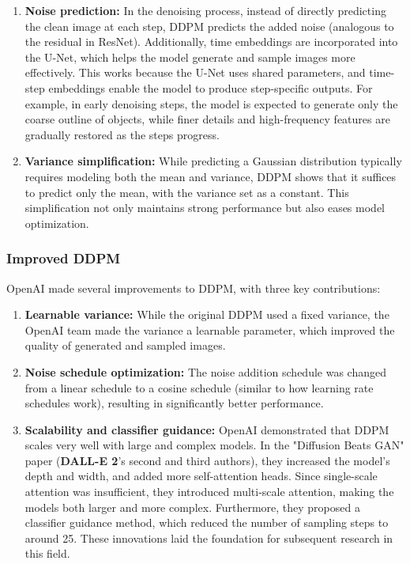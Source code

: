 \documentclass{article}
\begin{document}
\begin{enumerate}
    \item \textbf{Noise prediction:} In the denoising process, instead of directly predicting the clean image 
    at each step, DDPM predicts the added noise (analogous to the residual in ResNet). Additionally, time 
    embeddings are incorporated into the U-Net, which helps the model generate and sample images more 
    effectively. This works because the U-Net uses shared parameters, and time-step embeddings enable the 
    model to produce step-specific outputs. For example, in early denoising steps, the model is expected to 
    generate only the coarse outline of objects, while finer details and high-frequency features are 
    gradually restored as the steps progress.
    \item \textbf{Variance simplification:} While predicting a Gaussian distribution typically requires 
    modeling both the mean and variance, DDPM shows that it suffices to predict only the mean, with the 
    variance set as a constant. This simplification not only maintains strong performance but also eases 
    model optimization.
\end{enumerate}

\subsubsection{Improved DDPM}

OpenAI made several improvements to DDPM, with three key contributions:

\begin{enumerate}
    \item \textbf{Learnable variance:} While the original DDPM used a fixed variance, the OpenAI team made 
    the variance a learnable parameter, which improved the quality of generated and sampled images.
    \item \textbf{Noise schedule optimization:} The noise addition schedule was changed from a linear 
    schedule to a cosine schedule (similar to how learning rate schedules work), resulting in significantly 
    better performance.
    \item \textbf{Scalability and classifier guidance:} OpenAI demonstrated that DDPM scales very well with 
    large and complex models. In the "Diffusion Beats GAN" paper (\textbf{DALL-E 2}'s second and third 
    authors), they increased the model's depth and width, and added more self-attention heads. Since 
    single-scale attention was insufficient, they introduced multi-scale attention, making the models both 
    larger and more complex. Furthermore, they proposed a classifier guidance method, which reduced the 
    number of sampling steps to around 25. These innovations laid the foundation for subsequent research in 
    this field.
\end{enumerate}
\end{document}
